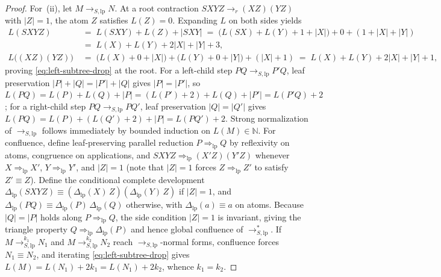 \documentclass[11pt,reqno]{amsart}
\numberwithin{equation}{section}
\theoremstyle{plain}
\theoremstyle{definition}
\theoremstyle{remark}
\begin{document}
\begin{proof}
For~(ii), let $M \to_{S,\mathrm{lp}} N$. At a root contraction $S X Y Z \to_r (X Z)(Y Z)$ with $|Z| = 1$, the atom $Z$ satisfies $L(Z) = 0$. Expanding $L$ on both sides yields
\begin{align*}
  L(S X Y Z) &\;=\; L(S X Y) + L(Z) + |S X Y| \;=\; \bigl(L(S X) + L(Y) + 1 + |X|\bigr) + 0 + (1 + |X| + |Y|) \\
             &\;=\; L(X) + L(Y) + 2|X| + |Y| + 3, \\
  L\bigl((X Z)(Y Z)\bigr) &\;=\; \bigl(L(X) + 0 + |X|\bigr) + \bigl(L(Y) + 0 + |Y|\bigr) + (|X| + 1) \;=\; L(X) + L(Y) + 2|X| + |Y| + 1,
\end{align*}
proving \eqref{eq:left-subtree-drop} at the root. For a left-child step $P Q \to_{S,\mathrm{lp}} P' Q$, leaf preservation $|P| + |Q| = |P'| + |Q|$ gives $|P| = |P'|$, so $L(P Q) = L(P) + L(Q) + |P| = (L(P') + 2) + L(Q) + |P'| = L(P' Q) + 2$; for a right-child step $P Q \to_{S,\mathrm{lp}} P Q'$, leaf preservation $|Q| = |Q'|$ gives $L(P Q) = L(P) + (L(Q') + 2) + |P| = L(P Q') + 2$. Strong normalization of $\to_{S,\mathrm{lp}}$ follows immediately by bounded induction on $L(M) \in \mathbb{N}$. For confluence, define leaf-preserving parallel reduction $P \Rightarrow_{\mathrm{lp}} Q$ by reflexivity on atoms, congruence on applications, and $S X Y Z \Rightarrow_{\mathrm{lp}} (X' Z)(Y' Z)$ whenever $X \Rightarrow_{\mathrm{lp}} X'$, $Y \Rightarrow_{\mathrm{lp}} Y'$, and $|Z| = 1$ (note that $|Z| = 1$ forces $Z \Rightarrow_{\mathrm{lp}} Z'$ to satisfy $Z' \equiv Z$). Define the conditional complete development $\Delta_{\mathrm{lp}}(S X Y Z) \equiv (\Delta_{\mathrm{lp}}(X)\,Z)(\Delta_{\mathrm{lp}}(Y)\,Z)$ if $|Z| = 1$, and $\Delta_{\mathrm{lp}}(P Q) \equiv \Delta_{\mathrm{lp}}(P)\,\Delta_{\mathrm{lp}}(Q)$ otherwise, with $\Delta_{\mathrm{lp}}(a) \equiv a$ on atoms. Because $|Q| = |P|$ holds along $P \Rightarrow_{\mathrm{lp}} Q$, the side condition $|Z| = 1$ is invariant, giving the triangle property $Q \Rightarrow_{\mathrm{lp}} \Delta_{\mathrm{lp}}(P)$ and hence global confluence of $\to_{S,\mathrm{lp}}^*$. If $M \to_{S,\mathrm{lp}}^{k_1} N_1$ and $M \to_{S,\mathrm{lp}}^{k_2} N_2$ reach $\to_{S,\mathrm{lp}}$-normal forms, confluence forces $N_1 \equiv N_2$, and iterating \eqref{eq:left-subtree-drop} gives $L(M) = L(N_1) + 2 k_1 = L(N_1) + 2 k_2$, whence $k_1 = k_2$.


\end{proof}
\end{document}
